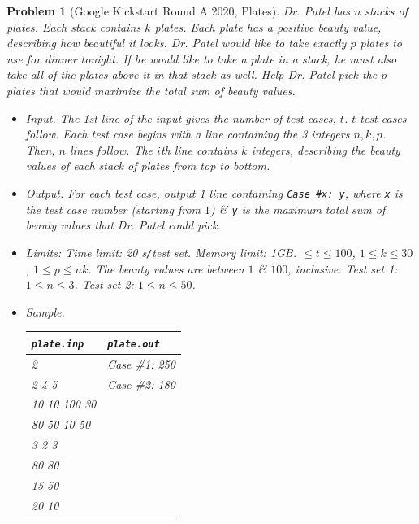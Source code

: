 \documentclass{article}
\newtheorem{problem}{Problem}
\begin{document}
\begin{problem}[Google Kickstart Round A 2020, Plates]
	Dr. Patel has $n$ stacks of plates. Each stack contains $k$ plates. Each plate has a positive beauty value, describing how beautiful it looks. Dr. Patel would like to take exactly $p$ plates to use for dinner tonight. If he would like to take a plate in a stack, he must also take all of the plates above it in that stack as well. Help Dr. Patel pick the $p$ plates that would maximize the total sum of beauty values.
	\begin{itemize}
		\item {\sf Input.} The 1st line of the input gives the number of test cases, $t$. $t$ test cases follow. Each test case begins with a line containing the 3 integers $n,k,p$. Then, $n$ lines follow. The $i$th line contains $k$ integers, describing the beauty values of each stack of plates from top to bottom.
		\item {\sf Output.} For each test case, output 1 line containing \verb|Case #x: y|, where \texttt{x} is the test case number (starting from $1$) \& \texttt{y} is the maximum total sum of beauty values that Dr. Patel could pick.
		\item {\sf Limits:} Time limit: \emph{20 s\texttt{/}test set}. Memory limit: \emph{1GB}. $\le t\le100$, $1\le k\le30$, $1\le p\le nk$. The beauty values are between $1$ \& $100$, inclusive. Test set 1: $1\le n\le 3$. Test set 2: $1\le n\le50$.
		\item {\sf Sample.}
		\begin{table}[H]
			\centering
			\begin{tabular}{|l|l|}
				\hline
				\texttt{plate.inp} & \texttt{plate.out} \\
				\hline
				2 & Case \#1: 250 \\
				2 4 5 & Case \#2: 180 \\
				10 10 100 30 & \\
				80 50 10 50 & \\
				3 2 3 & \\
				80 80 & \\
				15 50 & \\
				20 10 & \\
				\hline
			\end{tabular}
		\end{table}
	\end{itemize}
\end{problem}

\end{document}
